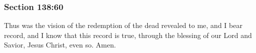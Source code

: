 	\subsubsection{Section 138:60} %
		\label{DC138-60}

		Thus was the vision of the redemption of the dead revealed to me, and I bear record, and I know that this record is true, through the blessing of our Lord and Savior, Jesus Christ, even so. Amen.

